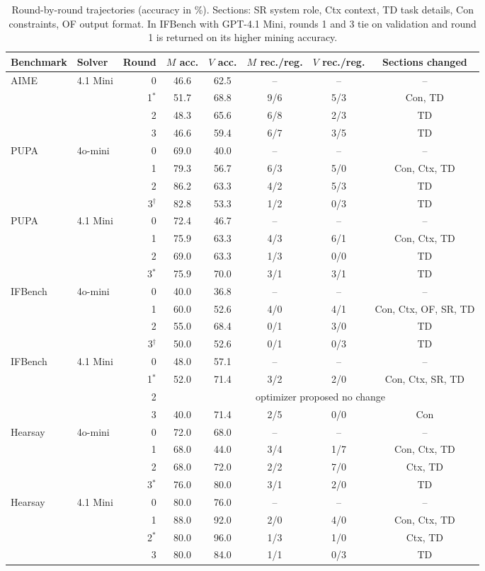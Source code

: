 \documentclass[11pt]{article}
\begin{document}
\begin{table}[htbp]
\centering
\small
\setlength{\tabcolsep}{4pt}
\begin{tabular}{llrccccc}
\toprule
\rowcolor{midblue}Benchmark & Solver & Round & $M$ acc. & $V$ acc. & $M$ rec./reg. & $V$ rec./reg. & Sections changed \\
\midrule
AIME & 4.1 Mini & 0 & 46.6 & 62.5 & -- & -- & -- \\
 & & 1$^*$ & 51.7 & 68.8 & 9/6 & 5/3 & Con, TD \\
 & & 2 & 48.3 & 65.6 & 6/8 & 2/3 & TD \\
 & & 3 & 46.6 & 59.4 & 6/7 & 3/5 & TD \\
\midrule
PUPA & 4o-mini & 0 & 69.0 & 40.0 & -- & -- & -- \\
 & & 1 & 79.3 & 56.7 & 6/3 & 5/0 & Con, Ctx, TD \\
 & & 2 & 86.2 & 63.3 & 4/2 & 5/3 & TD \\
 & & 3$^\dagger$ & 82.8 & 53.3 & 1/2 & 0/3 & TD \\
\midrule
PUPA & 4.1 Mini & 0 & 72.4 & 46.7 & -- & -- & -- \\
 & & 1 & 75.9 & 63.3 & 4/3 & 6/1 & Con, Ctx, TD \\
 & & 2 & 69.0 & 63.3 & 1/3 & 0/0 & TD \\
 & & 3$^*$ & 75.9 & 70.0 & 3/1 & 3/1 & TD \\
\midrule
IFBench & 4o-mini & 0 & 40.0 & 36.8 & -- & -- & -- \\
 & & 1 & 60.0 & 52.6 & 4/0 & 4/1 & Con, Ctx, OF, SR, TD \\
 & & 2 & 55.0 & 68.4 & 0/1 & 3/0 & TD \\
 & & 3$^\dagger$ & 50.0 & 52.6 & 0/1 & 0/3 & TD \\
\midrule
IFBench & 4.1 Mini & 0 & 48.0 & 57.1 & -- & -- & -- \\
 & & 1$^*$ & 52.0 & 71.4 & 3/2 & 2/0 & Con, Ctx, SR, TD \\
 & & 2 & \multicolumn{5}{c}{optimizer proposed no change} \\
 & & 3 & 40.0 & 71.4 & 2/5 & 0/0 & Con \\
\midrule
Hearsay & 4o-mini & 0 & 72.0 & 68.0 & -- & -- & -- \\
 & & 1 & 68.0 & 44.0 & 3/4 & 1/7 & Con, Ctx, TD \\
 & & 2 & 68.0 & 72.0 & 2/2 & 7/0 & Ctx, TD \\
 & & 3$^*$ & 76.0 & 80.0 & 3/1 & 2/0 & TD \\
\midrule
Hearsay & 4.1 Mini & 0 & 80.0 & 76.0 & -- & -- & -- \\
 & & 1 & 88.0 & 92.0 & 2/0 & 4/0 & Con, Ctx, TD \\
 & & 2$^*$ & 80.0 & 96.0 & 1/3 & 1/0 & Ctx, TD \\
 & & 3 & 80.0 & 84.0 & 1/1 & 0/3 & TD \\
\bottomrule
\end{tabular}
\caption{Round-by-round trajectories (accuracy in \%). Sections: SR system role, Ctx context, TD task details,
Con constraints, OF output format. In IFBench with GPT-4.1 Mini, rounds 1 and 3 tie on validation and round 1
is returned on its higher mining accuracy.}
\label{tab:rounds}
\end{table}
\end{document}
